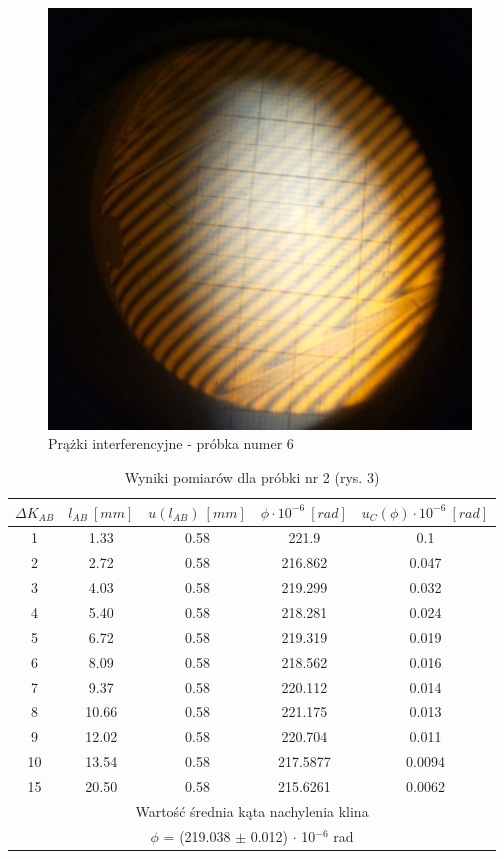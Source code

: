 \documentclass[12pt, a4paper, oneside]{article}
\begin{document}
\clearpage
\begin{figure}[t]
\centering
\caption{Prążki interferencyjne - próbka numer 6}
\includegraphics[scale=.4129]{pics/f7.png}
\end{figure}
\clearpage
\begin{table}[h]
  \centering
  \caption{Wyniki pomiarów dla próbki nr 2 (rys. 3)}
    \begin{tabular}{|c|c|c|c|c|}\hline
    $\Delta K_{AB}$ & $l_{AB}~[mm]$ & $u(l_{AB})~[mm]$ & $\phi\cdot 10^{-6}~[rad]$ & $u_C(\phi)\cdot 10^{-6}~[rad]$ \\\hline
    1 & 1.33 & 0.58 & 221.9 & 0.1 \\\hline
    2 & 2.72 & 0.58 & 216.862 & 0.047 \\\hline
    3 & 4.03 & 0.58 & 219.299 & 0.032 \\\hline
    4 & 5.40 & 0.58 & 218.281 & 0.024 \\\hline
    5 & 6.72 & 0.58 & 219.319 & 0.019 \\\hline
    6 & 8.09 & 0.58 & 218.562 & 0.016 \\\hline
    7 & 9.37 & 0.58 & 220.112 & 0.014 \\\hline
    8 & 10.66 & 0.58 & 221.175 & 0.013 \\\hline
    9 & 12.02 & 0.58 & 220.704 & 0.011 \\\hline
    10 & 13.54 & 0.58 & 217.5877 & 0.0094 \\\hline
    15 & 20.50 & 0.58 & 215.6261 & 0.0062 \\\hline
    \multicolumn{5}{|c|}{Wartość średnia kąta nachylenia klina} \\\hline
    \multicolumn{5}{|c|}{$\phi$ = (219.038 $\pm$ 0.012) $\cdot$ 10$^{-6}$ rad} \\\hline
    \end{tabular}%
  \label{tab:addlabel}%
\end{table}%
\end{document}
